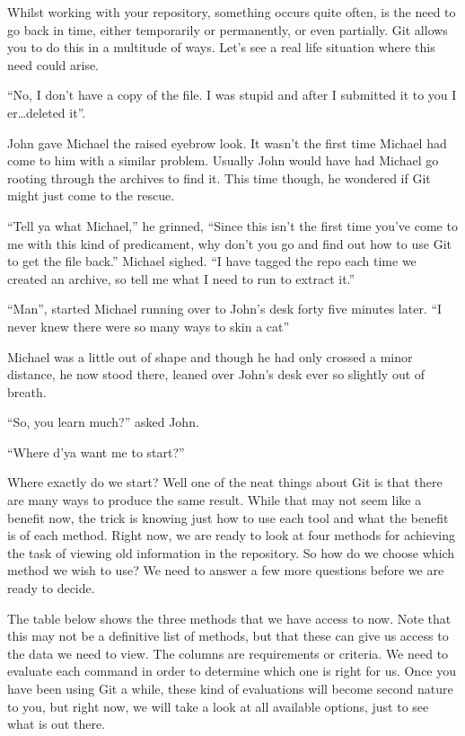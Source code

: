 Whilst working with your repository, something occurs quite often, is the need to go back in time, either temporarily or permanently, or even partially.
Git allows you to do this in a multitude of ways.
Let's see a real life situation where this need could arise.

\begin{trenches}
``No, I don't have a copy of the file.
I was stupid and after I submitted it to you I er\ldots deleted it''.

John gave Michael the raised eyebrow look.
It wasn't the first time Michael had come to him with a similar problem.
Usually John would have had Michael go rooting through the archives to find it.
This time though, he wondered if Git might just come to the rescue.

``Tell ya what Michael,'' he grinned,
``Since this isn't the first time you've come to me with this kind of predicament, why don't you go and find out how to use Git to get the file back.'' Michael sighed.
``I have tagged the repo each time we created an archive, so tell me what I need to run to extract it.''

\thoughtbreak

``Man'', started Michael running over to John's desk forty five minutes later.
``I never knew there were so many ways to skin a cat''

Michael was a little out of shape and though he had only crossed a minor distance, he now stood there, leaned over John's desk ever so slightly out of breath.

``So, you learn much?'' asked John.

``Where d'ya want me to start?''

\end{trenches}

Where exactly do we start? Well one of the neat things about Git is that there are many ways to produce the same result.
While that may not seem like a benefit now, the trick is knowing just how to use each tool and what the benefit is of each method.
Right now, we are ready to look at four methods for achieving the task of viewing old information in the repository.
So how do we choose which method we wish to use? We need to answer a few more questions before we are ready to decide.

The table below shows the three methods that we have access to now.
Note that this may not be a definitive list of methods, but that these can give us access to the data we need to view.
The columns are requirements or criteria.
We need to evaluate each command in order to determine which one is right for us.
Once you have been using Git a while, these kind of evaluations will become second nature to you, but right now, we will take a look at all available options, just to see what is out there.

